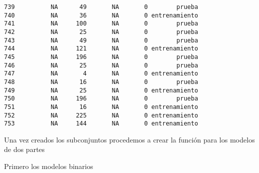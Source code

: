 \documentclass[
  letterpaper,
  DIV=11,
  numbers=noendperiod]{scrreprt}
\newenvironment{Shaded}{\begin{snugshade}}{\end{snugshade}}
\newcommand{\AttributeTok}[1]{\textcolor[rgb]{0.40,0.45,0.13}{#1}}
\newcommand{\CommentTok}[1]{\textcolor[rgb]{0.37,0.37,0.37}{#1}}
\newcommand{\FunctionTok}[1]{\textcolor[rgb]{0.28,0.35,0.67}{#1}}
\newcommand{\NormalTok}[1]{\textcolor[rgb]{0.00,0.23,0.31}{#1}}
\newcommand{\OtherTok}[1]{\textcolor[rgb]{0.00,0.23,0.31}{#1}}
\newcommand{\SpecialCharTok}[1]{\textcolor[rgb]{0.37,0.37,0.37}{#1}}
\newcommand{\StringTok}[1]{\textcolor[rgb]{0.13,0.47,0.30}{#1}}
\begin{document}
\begin{verbatim}
739          NA      49       NA       0        prueba
740          NA      36       NA       0 entrenamiento
741          NA     100       NA       0        prueba
742          NA      25       NA       0        prueba
743          NA      49       NA       0        prueba
744          NA     121       NA       0 entrenamiento
745          NA     196       NA       0        prueba
746          NA      25       NA       0        prueba
747          NA       4       NA       0 entrenamiento
748          NA      16       NA       0        prueba
749          NA      25       NA       0 entrenamiento
750          NA     196       NA       0        prueba
751          NA      16       NA       0 entrenamiento
752          NA     225       NA       0 entrenamiento
753          NA     144       NA       0 entrenamiento
\end{verbatim}

Una vez creados los subconjuntos procedemos a crear la función para los
modelos de dos partes

Primero los modelos binarios

\begin{Shaded}
\end{Shaded}
\end{document}
